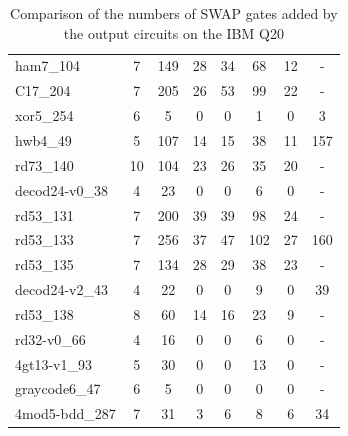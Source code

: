 \documentclass[runningheads]{llncs}
\begin{document}
\begin{table}[!ht]
\begin{center}
\begin{tabular}{|p{4.3cm}<{\centering}|c|c|c|c|c|c|c|}
ham7\_104 & 7 & 149 & 28 & 34 & 68 & 12& - 	\\
C17\_204 & 7 & 205 & 26 & 53 & 99 & 22& - 	\\
xor5\_254 & 6 & 5 & 0 & 0 & 1 & 0& 3	\\
hwb4\_49 & 5 & 107 & 14 & 15 & 38 & 11& 157 	\\
rd73\_140 & 10 & 104 & 23 & 26 & 35 & 20& - 	\\
decod24-v0\_38 & 4 & 23 & 0 & 0 & 6 & 0& - 	\\
rd53\_131 & 7 & 200 & 39 & 39 & 98 & 24& - 	\\
rd53\_133 & 7 & 256 & 37 & 47 & 102 & 27& 160 	\\
rd53\_135 & 7 & 134 & 28 & 29 & 38 & 23& - 	\\
decod24-v2\_43 & 4 & 22 & 0 & 0 & 9 & 0& 39 \\
rd53\_138 & 8 & 60 & 14 & 16 & 23 & 9& - \\
rd32-v0\_66 & 4 & 16 & 0 & 0 & 6 & 0& - \\
4gt13-v1\_93 & 5 & 30 & 0 & 0 & 13 & 0& - \\
graycode6\_47 & 6 & 5 & 0 & 0 & 0 & 0& - \\
4mod5-bdd\_287 & 7 & 31 & 3 & 6 & 8 & 6& 34 \\
\hline
	\end{tabular} 
	\end{center}
	\caption{Comparison of  the numbers of SWAP gates added by the 
	output circuits on the IBM Q20 } 
	\label{tab2}
	\end{table}
\end{document}
